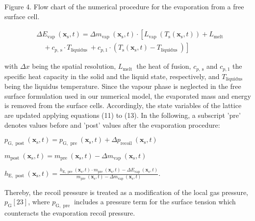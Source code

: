 \documentclass[10pt]{article}
\begin{document}
Figure 4. Flow chart of the numerical procedure for the evaporation from a free surface cell.


\begin{align*}
& \Delta E_{\text {vap }}\left(\boldsymbol{x}_{\mathrm{s}}, t\right)=\Delta m_{\text {vap }}\left(\boldsymbol{x}_{\mathrm{s}}, t\right) \cdot\left[L_{\text {vap }}\left(T_{\mathrm{s}}\left(\boldsymbol{x}_{\mathrm{s}}, t\right)\right)+L_{\text {melt }}\right. \\
& \left.\quad+c_{p, \mathrm{~s}} \cdot T_{\text {liquidus }}+c_{p, 1} \cdot\left(T_{\mathrm{s}}\left(\boldsymbol{x}_{\mathrm{s}}, t\right)-T_{\text {liquidus }}\right)\right] \tag{13}
\end{align*}


with $\Delta x$ being the spatial resolution, $L_{\text {melt }}$ the heat of fusion, $c_{p, \mathrm{~s}}$ and $c_{p, 1}$ the specific heat capacity in the solid and the liquid state, respectively, and $T_{\text {liquidus }}$ being the liquidus temperature. Since the vapour phase is neglected in the free surface formulation used in our numerical model, the evaporated mass and energy is removed from the surface cells. Accordingly, the state variables of the lattice are updated applying equations (11) to (13). In the following, a subscript 'pre' denotes values before and 'post' values after the evaporation procedure:

$p_{\mathrm{G}, \text { post }}\left(\boldsymbol{x}_{\mathrm{s}}, t\right)=p_{\mathrm{G}, \text { pre }}\left(\boldsymbol{x}_{\mathrm{s}}, t\right)+\Delta p_{\text {recoil }}\left(\boldsymbol{x}_{\mathrm{s}}, t\right)$

$m_{\text {post }}\left(\boldsymbol{x}_{\mathrm{s}}, t\right)=m_{\text {pre }}\left(\boldsymbol{x}_{\mathrm{s}}, t\right)-\Delta m_{\text {vap }}\left(\boldsymbol{x}_{\mathrm{s}}, t\right)$

$h_{\mathrm{E}, \text { post }}\left(\boldsymbol{x}_{\mathrm{s}}, t\right)=\frac{h_{\mathrm{E}, \text { pre }}\left(\boldsymbol{x}_{\mathrm{s}}, t\right) \cdot m_{\text {pre }}\left(\boldsymbol{x}_{\mathrm{s}}, t\right)-\Delta E_{\text {vap }}\left(\boldsymbol{x}_{\mathrm{s}}, t\right)}{m_{\text {pre }}\left(\boldsymbol{x}_{\mathrm{s}}, t\right)-\Delta m_{\text {vap }}\left(\boldsymbol{x}_{\mathrm{s}}, t\right)}$.

Thereby, the recoil pressure is treated as a modification of the local gas pressure, $p_{\mathrm{G}}[23]$, where $p_{\mathrm{G}, \text { pre }}$ includes a pressure term for the surface tension which counteracts the evaporation recoil pressure.
\end{document}
